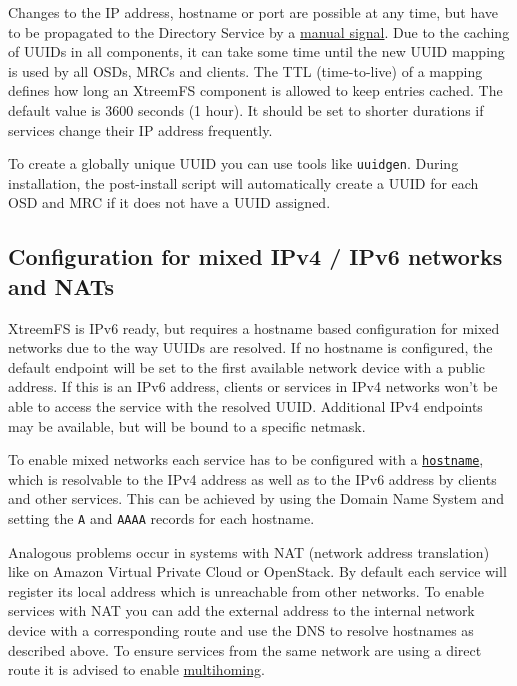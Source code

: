 \documentclass[a4paper,10pt]{book}
\begin{document}
Changes to the IP address, hostname or port are possible at any time, but have to be propagated to the Directory Service by a \hyperref[option:multihoming.renewalsignal]{manual signal}. Due to the caching of UUIDs in all components, it can take some time until the new UUID mapping is used by all OSDs, MRCs and clients. The TTL (time-to-live) of a mapping defines how long an XtreemFS component is allowed to keep entries cached. The default value is 3600 seconds (1 hour). It should be set to shorter durations if services change their IP address frequently.

To create a globally unique UUID you can use tools like \texttt{uuidgen}. During installation, the post-install script will automatically create a UUID for each OSD and MRC if it does not have a UUID assigned.


\subsection{Configuration for mixed IPv4 / IPv6 networks and NATs}

XtreemFS is IPv6 ready, but requires a hostname based configuration for mixed networks due to the way UUIDs are resolved. If no hostname is configured, the default endpoint will be set to the first available network device with a public address. If this is an IPv6 address, clients or services in IPv4 networks won't be able to access the service with the resolved UUID. Additional IPv4 endpoints may be available, but will be bound to a specific netmask.

To enable mixed networks each service has to be configured with a \hyperref[options:hostname]{\texttt{hostname}}, which is resolvable to the IPv4 address as well as to the IPv6 address by clients and other services. This can be achieved by using the Domain Name System and setting the \texttt{A} and \texttt{AAAA} records for each hostname.

Analogous problems occur in systems with NAT (network address translation) like on Amazon Virtual Private Cloud or OpenStack. By default each service will register its local address which is unreachable from other networks. To enable services with NAT you can add the external address to the internal network device with a corresponding route and use the DNS to resolve hostnames as described above. To ensure services from the same network are using a direct route it is advised to enable \hyperref[option:multihoming.enabled]{multihoming}. 
\end{document}
